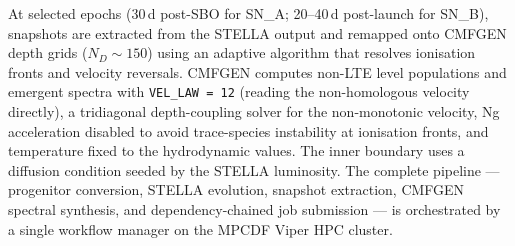 \documentclass[11pt, a4paper]{article}
\begin{document}
At selected epochs (30\,d post-SBO for SN\_A; 20--40\,d post-launch for SN\_B),
snapshots are extracted from the STELLA output and remapped onto CMFGEN depth
grids ($N_D \sim 150$) using an adaptive algorithm that resolves ionisation
fronts and velocity reversals.  CMFGEN computes non-LTE level populations and
emergent spectra with \texttt{VEL\_LAW\,=\,12} (reading the non-homologous
velocity directly), a tridiagonal depth-coupling solver for the non-monotonic
velocity, Ng acceleration disabled to avoid trace-species instability at
ionisation fronts, and temperature fixed to the hydrodynamic values.  The
inner boundary uses a diffusion condition seeded by the STELLA luminosity.
The complete pipeline --- progenitor conversion, STELLA evolution, snapshot
extraction, CMFGEN spectral synthesis, and dependency-chained job submission
--- is orchestrated by a single workflow manager on the MPCDF Viper HPC
cluster.



\end{document}
